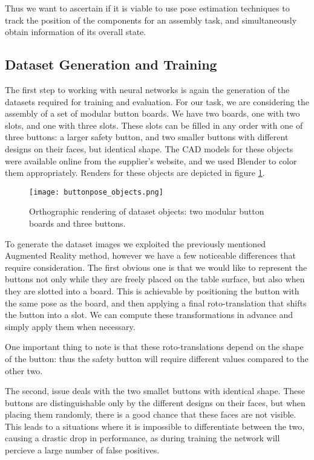 Thus we want to ascertain if it is viable to use pose estimation techniques to track the position of the components for an assembly task, and simultaneously obtain information of its overall state.

\subsection{Dataset Generation and Training}

The first step to working with neural networks is again the generation of the datasets required for training and evaluation. For our task, we are considering the assembly of a set of modular button boards. We have two boards, one with two slots, and one with three slots. These slots can be filled in any order with one of three buttons: a larger safety button, and two smaller buttons with different designs on their faces, but identical shape. The CAD models for these objects were available online from the supplier's website, and we used Blender to color them appropriately. Renders for these objects are depicted in figure \ref{fig:buttonpose_objects}.

\begin{figure}[ht]
    \texttt{[image: buttonpose\_objects.png]}
    \caption{Orthographic rendering of dataset objects: two modular button boards and three buttons.}
    \label{fig:buttonpose_objects}
\end{figure}

To generate the dataset images we exploited the previously mentioned Augmented Reality method, however we have a few noticeable differences that require consideration. The first obvious one is that we would like to represent the buttons not only while they are freely placed on the table surface, but also when they are slotted into a board. This is achievable by positioning the button with the same pose as the board, and then applying a final roto-translation that shifts the button into a slot. We can compute these transformations in advance and simply apply them when necessary.

One important thing to note is that these roto-translations depend on the shape of the button: thus the safety button will require different values compared to the other two.

The second, issue deals with the two smallet buttons with identical shape. These buttons are distinguishable only by the different designs on their faces, but when placing them randomly, there is a good chance that these faces are not visible. This leads to a situations where it is impossible to differentiate between the two, causing a drastic drop in performance, as during training the network will percieve a large number of false positives.

